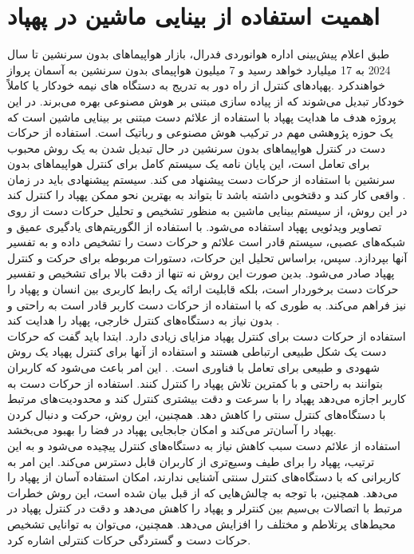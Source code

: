  \section{اهمیت استفاده از بینایی ماشین در پهپاد}
 طبق اعلام پیش‌بینی اداره هوانوردی فدرال، بازار هواپیماهای بدون سرنشین تا سال 2024 به 17 میلیارد خواهد رسید و 7 میلیون هواپیمای بدون سرنشین به آسمان پرواز خواهند‌کرد .پهپادهای کنترل
 از راه دور به تدریج به دستگاه های نیمه خودکار یا کاملاً خودکار تبدیل می‌شوند که از پیاده سازی مبتنی بر هوش مصنوعی بهره می‌برند. 
 در این پروژه هدف ما هدایت پهپاد با استفاده از علائم دست مبتنی بر بینایی ماشین است که یک حوزه پژوهشی مهم در ترکیب هوش مصنوعی و رباتیک است. 
 استفاده از حرکات دست در کنترل هواپیماهای بدون سرنشین در حال تبدیل شدن به یک روش محبوب برای تعامل است، این پایان نامه یک سیستم کامل برای کنترل هواپیماهای بدون سرنشین 
 با استفاده از حرکات دست پیشنهاد می کند. سیستم پیشنهادی باید در زمان واقعی کار کند و دقتخوبی داشته باشد تا بتواند به بهترین نحو ممکن پهپاد را کنترل کند \cite{hadri2018hand}.
 \\
 در این روش، از سیستم بینایی ماشین به منظور تشخیص و تحلیل حرکات دست از روی تصاویر ویدئویی پهپاد استفاده می‌شود. با استفاده از الگوریتم‌های یادگیری عمیق و شبکه‌های عصبی، سیستم 
 قادر است علائم و حرکات دست را تشخیص داده و به تفسیر آنها بپردازد. سپس، براساس تحلیل این حرکات، دستورات مربوطه برای حرکت و کنترل پهپاد صادر می‌شود.
 بدین صورت این روش نه تنها از دقت بالا برای تشخیص و تفسیر حرکات دست برخوردار است، بلکه قابلیت ارائه یک رابط کاربری بین انسان و پهپاد را نیز فراهم می‌کند. 
 به طوری که با استفاده از حرکات دست کاربر قادر است به راحتی و بدون نیاز به دستگاه‌های کنترل خارجی، پهپاد را هدایت کند \cite{yoo2022motion}.
\\
استفاده از حرکات دست برای کنترل پهپاد مزایای زیادی دارد. ابتدا باید گفت که حرکات دست یک شکل طبیعی ارتباطی هستند و استفاده از آنها برای کنترل پهپاد یک روش شهودی و طبیعی برای تعامل با فناوری است.
. این امر باعث می‌شود که کاربران بتوانند به راحتی و با کمترین تلاش پهپاد را کنترل کنند. استفاده از حرکات دست به کاربر اجازه می‌دهد پهپاد را با سرعت و دقت
بیشتری کنترل کند و محدودیت‌های مرتبط با دستگاه‌های کنترل سنتی را کاهش دهد. همچنین، این روش، حرکت و دنبال کردن پهپاد را آسان‌تر می‌کند و امکان جابجایی پهپاد در فضا را بهبود می‌بخشد.
\\
استفاده از علائم دست سبب کاهش نیاز به دستگاه‌های کنترل پیچیده می‌شود و به این ترتیب، پهپاد را برای طیف وسیع‌تری از کاربران قابل دسترس می‌کند.
این امر به کاربرانی که با دستگاه‌های کنترل سنتی آشنایی ندارند، امکان استفاده آسان از پهپاد را می‌دهد. همچنین، با توجه به چالش‌هایی که از قبل بیان شده است، 
این روش خطرات مرتبط با اتصالات بی‌سیم بین کنترلر و پهپاد را کاهش می‌دهد و دقت در کنترل پهپاد در محیط‌های پرتلاطم و مختلف را افزایش می‌دهد. 
همچنین، می‌توان به توانایی تشخیص حرکات دست و گستردگی حرکات کنترلی اشاره کرد.





 